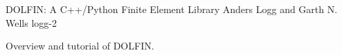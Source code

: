               {DOLFIN: A C++/Python Finite Element Library}
              {Anders Logg and Garth N. Wells}
              {logg-2}

Overview and tutorial of DOLFIN.

